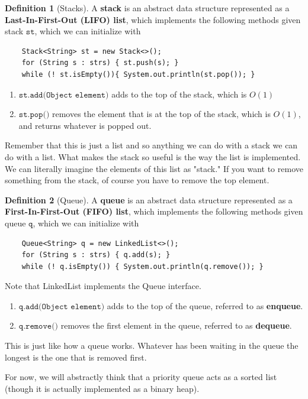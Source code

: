 \documentclass{article}
\theoremstyle{definition}
\theoremstyle{remark}
\theoremstyle{definition}
\newtheorem{definition}{Definition}[section]
\begin{document}
\begin{definition}[Stacks]
A \textbf{stack} is an abstract data structure represented as a \textbf{Last-In-First-Out (LIFO) list}, which implements the following methods given stack $\texttt{st}$, which we can initialize with 
\begin{verbatim}
    Stack<String> st = new Stack<>(); 
    for (String s : strs) { st.push(s); }
    while (! st.isEmpty()){ System.out.println(st.pop()); }
\end{verbatim}
\begin{enumerate}
    \item $\texttt{st.add(Object element)}$ adds to the top of the stack, which is $O(1)$ 
    \item $\texttt{st.pop()}$ removes the element that is at the top of the stack, which is $O(1)$, and returns whatever is popped out. 
\end{enumerate}
Remember that this is just a list and so anything we can do with a stack we can do with a list. What makes the stack so useful is the way the list is implemented. We can literally imagine the elements of this list as "stack." If you want to remove something from the stack, of course you have to remove the top element. 
\end{definition}

\begin{definition}[Queue]
A \textbf{queue} is an abstract data structure represented as a \textbf{First-In-First-Out (FIFO) list}, which implements the following methods given queue $\texttt{q}$, which we can initialize with 
\begin{verbatim}
    Queue<String> q = new LinkedList<>(); 
    for (String s : strs) { q.add(s); }
    while (! q.isEmpty()) { System.out.println(q.remove()); }
\end{verbatim}
Note that LinkedList implements the Queue interface. 
\begin{enumerate}
    \item $\texttt{q.add(Object element)}$ adds to the top of the queue, referred to as \textbf{enqueue}. 
    \item $\texttt{q.remove()}$ removes the first element in the queue, referred to as \textbf{dequeue}. 
\end{enumerate}
This is just like how a queue works. Whatever has been waiting in the queue the longest is the one that is removed first. 
\end{definition}

For now, we will abstractly think that a priority queue acts as a sorted list (though it is actually implemented as a binary heap). 
\end{document}

